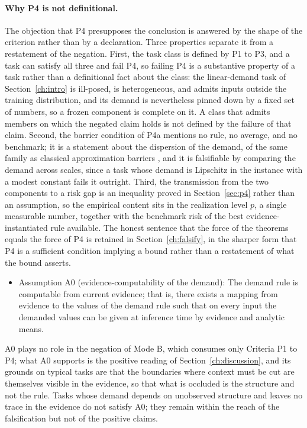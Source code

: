 \paragraph{Why P4 is not definitional.} The objection that P4 presupposes the conclusion is answered by the shape of the criterion rather than by a declaration. Three properties separate it from a restatement of the negation. First, the task class is defined by P1 to P3, and a task can satisfy all three and fail P4, so failing P4 is a substantive property of a task rather than a definitional fact about the class: the linear-demand task of Section~\ref{ch:intro} is ill-posed, is heterogeneous, and admits inputs outside the training distribution, and its demand is nevertheless pinned down by a fixed set of numbers, so a frozen component is complete on it. A class that admits members on which the negated claim holds is not defined by the failure of that claim. Second, the barrier condition of P4a mentions no rule, no average, and no benchmark; it is a statement about the dispersion of the demand, of the same family as classical approximation barriers \citep{kolmogorov1936,pinkus1985}, and it is falsifiable by comparing the demand across scales, since a task whose demand is Lipschitz in the instance with a modest constant fails it outright. Third, the transmission from the two components to a risk gap is an inequality proved in Section~\ref{sec:p4} rather than an assumption, so the empirical content sits in the realization level $p$, a single measurable number, together with the benchmark risk of the best evidence-instantiated rule available. The honest sentence that the force of the theorems equals the force of P4 is retained in Section~\ref{ch:falsify}, in the sharper form that P4 is a sufficient condition implying a bound rather than a restatement of what the bound asserts.

\begin{itemize}
\item Assumption A0 (evidence-computability of the demand): The demand rule is computable from current evidence; that is, there exists a mapping from evidence to the values of the demand rule such that on every input the demanded values can be given at inference time by evidence and analytic means.
\end{itemize}

A0 plays no role in the negation of Mode B, which consumes only Criteria P1 to P4; what A0 supports is the positive reading of Section~\ref{ch:discussion}, and its grounds on typical tasks are that the boundaries where context must be cut are themselves visible in the evidence, so that what is occluded is the structure and not the rule. Tasks whose demand depends on unobserved structure and leaves no trace in the evidence do not satisfy A0; they remain within the reach of the falsification but not of the positive claims.

